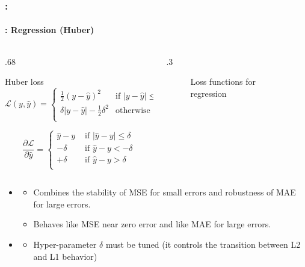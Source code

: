 \documentclass[xcolor=table]{beamer}
\begin{document}
\begin{frame}
	\frametitle{\insertshortsubtitle: \insertsection}
	\framesubtitle{\insertsubsection: Regression (Huber)}

	\vskip-12pt
	\begin{columns}
	\begin{column}{.68\linewidth}
	\begin{block}{Huber loss}
		\[\mathcal{L}(y, \hat{y}) = %
		\begin{cases}
		\frac{1}{2} (y - \hat{y})^2 & \text{if } |y - \hat{y}| \le \delta \\
		\delta |y - \hat{y}| - \frac{1}{2} \delta^2 & \text{otherwise}\\
		\end{cases}
		\]
		
		\[
		\frac{\partial \mathcal{L}}{\partial \hat{y}} = 
		\begin{cases}
		\hat{y} - y & \text{ if } |\hat{y} - y| \le \delta \\
		-\delta & \text{ if } \hat{y} - y < -\delta \\
		+\delta & \text{ if } \hat{y} - y > \delta \\
		\end{cases}
		\]
		
	\end{block}
	
	\end{column}%
	\begin{column}{.3\linewidth}
	\begin{figure}
		\caption{Loss functions for regression \cite{2017-rosenberg}}
	\end{figure}
	\end{column}
	\end{columns}
	
	\begin{itemize}
		\item {}
		\begin{itemize}
			\item Combines the stability of MSE for small errors and robustness of MAE for large errors.
			\item Behaves like MSE near zero error and like MAE for large errors.
		\end{itemize}
		\item {}
		\begin{itemize}
			\item Hyper-parameter $\delta$ must be tuned (it controls the transition between L2 and L1 behavior)
		\end{itemize}
	\end{itemize}

\end{frame}
\end{document}
